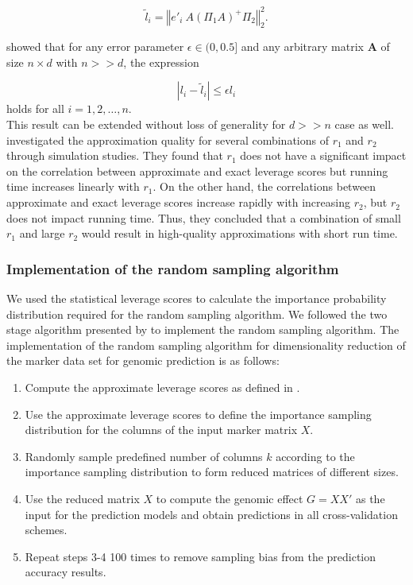\begin{equation} \label{eq:5}
\tilde{l}_i = \left\Vert e'_i\ A(\Pi_1 A)^+\Pi_2 \right\Vert_2^2.
\end{equation}

 \cite{drineas_fast_2012} showed that for any error parameter $\epsilon \in (0, 0.5]$ and any arbitrary matrix $\textbf{A}$ of size $n \times d$ with $n >> d$, the expression 

\begin{equation}
|l_i - \tilde{l}_i| \leq \epsilon l_i 
\end{equation}
 holds for all $i = 1, 2, \dots, n$. \\

This result can be  extended without loss of generality for $d >> n$ case as well. \cite{ma_statistical_2015} investigated the approximation quality for several combinations of $r_1$ and $r_2$ through simulation studies. They found that $r_1$ does not have a significant impact on the correlation between approximate and exact leverage scores but running time increases linearly with $r_1$. On the other hand, the correlations between approximate and exact leverage scores increase rapidly with increasing $r_2$, but $r_2$ does not impact running time. Thus, they concluded that a combination of small $r_1$ and large $r_2$ would result in high-quality approximations with short run time. \\

\subsubsection{Implementation of the random sampling algorithm}

We used the statistical leverage scores to calculate the importance probability distribution required for the random sampling algorithm. We followed the two stage algorithm presented by \cite{boutsidis_improved_2009} to implement the random sampling algorithm. The implementation of the random sampling algorithm for dimensionality reduction of the marker data set for genomic prediction is as follows:


\begin{enumerate}
    \item Compute the approximate leverage scores as defined in \cite{drineas_fast_2012}.
    \item Use the approximate leverage scores to define the importance sampling distribution for the columns of the input marker matrix $X$.
    \item Randomly sample predefined number of columns $k$ according to the importance sampling distribution to form reduced matrices of different sizes.
    \item Use the reduced matrix $X$ to compute the genomic effect $G = XX'$ as the input for the prediction models and obtain predictions in all cross-validation schemes. 
    \item Repeat steps 3-4 100 times to remove sampling bias from the prediction accuracy results.  
\end{enumerate}

